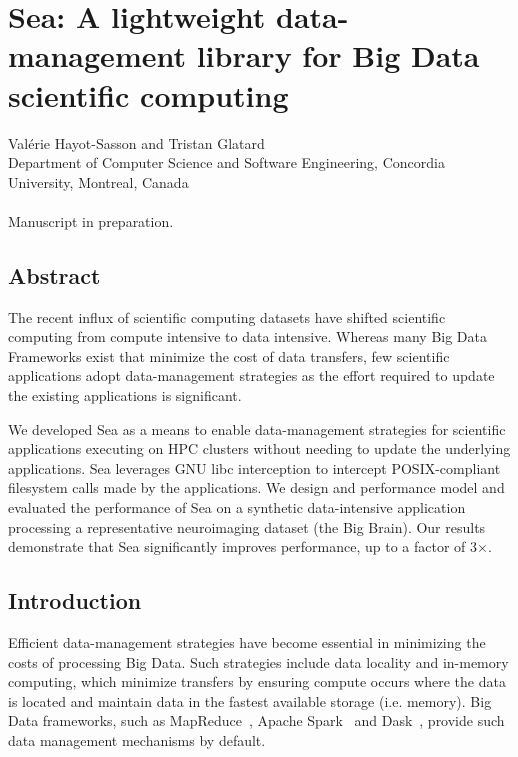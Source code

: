 \chapter{Sea: A lightweight data-management library for Big Data scientific computing}\label{chapter:sea-comp}

Val\'erie Hayot-Sasson and Tristan Glatard \\
\begingroup \footnotesize Department of Computer Science and Software
Engineering, Concordia University, Montreal, Canada \\
\endgroup 
\vspace{5pt} \\
Manuscript in preparation. \\

\section{Abstract}

The recent influx of scientific computing datasets have shifted scientific computing
from compute intensive to data intensive. Whereas many Big Data Frameworks exist that
minimize the cost of data transfers, few scientific applications adopt data-management
strategies as the effort required to update the existing applications is significant.

We developed Sea as a means to enable data-management strategies for scientific applications
executing on HPC clusters
without needing to update the underlying applications. Sea leverages GNU libc interception to intercept
POSIX-compliant filesystem calls made by the applications. We design and performance model and
evaluated the performance of Sea on a synthetic data-intensive application processing a representative 
neuroimaging dataset (the Big Brain). Our results demonstrate that Sea significantly improves 
performance, up to a factor of 3$\times$. 

\section{Introduction}\label{sec:introduction}
Efficient data-management
strategies have become essential in minimizing the costs of processing Big Data.
Such strategies include data locality and in-memory computing, which minimize
transfers by ensuring compute occurs where the data is located and maintain data
in the fastest available storage (i.e. memory). Big Data frameworks, such as
MapReduce~\cite{dean2008mapreduce}, Apache Spark~\cite{zaharia2016apache} and
Dask~\cite{rocklin2015dask}, provide such data management mechanisms by default.

